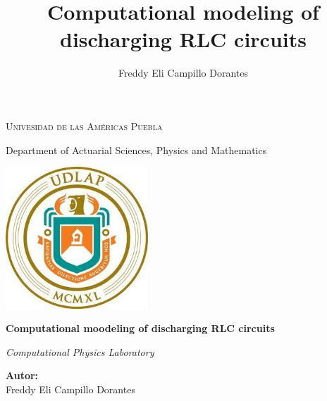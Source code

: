 \documentclass[12pt,twoside]{extarticle}
\title{\bfseries\huge \sffamily Computational modeling of discharging RLC circuits}
\author{\normalfont Freddy Eli Campillo Dorantes}
\date{\itshape\LARGE\bfseries}
\begin{document}
\begin{titlepage}
\centering
{\huge\scshape Univesidad de las Américas Puebla \par}
\vspace{0.5cm}
{\Large Department of Actuarial Sciences, Physics and Mathematics\par}
\vspace{2cm}
{\includegraphics[width=0.4\textwidth]{figures/EscudoUDLAP.jpg}\par}
\vspace{2cm}
{\sffamily\Huge\bfseries Computational moodeling of discharging RLC circuits\par}
\vspace{1cm}
    {\large\itshape Computational Physics Laboratory \par}
\vfill
{\textbf{Autor:}\\
 Freddy Eli Campillo Dorantes\par}
\end{titlepage}
\tableofcontents
\maketitle
\end{document}
